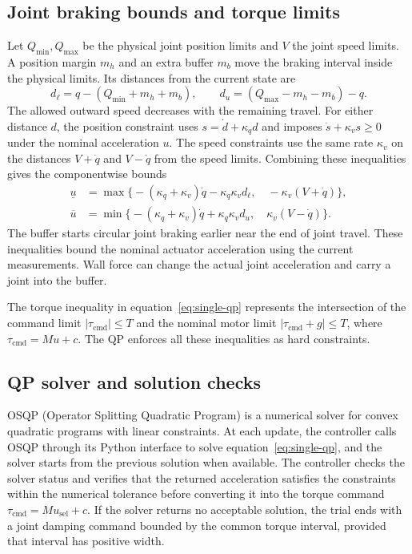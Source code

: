 \documentclass[11pt,a4paper]{article}
\begin{document}
\subsection{Joint braking bounds and torque limits}
Let $Q_{\min},Q_{\max}$ be the physical joint position limits and $V$ the
joint speed limits. A position margin $m_h$ and an extra buffer $m_b$
move the braking interval inside the physical limits. Its distances from
the current state are
\begin{equation}
 d_\ell=q-(Q_{\min}+m_h+m_b),\qquad
 d_u=(Q_{\max}-m_h-m_b)-q .
\end{equation}
The allowed outward speed decreases with the remaining travel.
For either distance $d$, the position constraint uses
$s=\dot d+\kappa_q d$ and imposes $\dot s+\kappa_v s\ge0$ under the
nominal acceleration $u$. The speed constraints use the same rate
$\kappa_v$ on the distances $V+\dot q$ and $V-\dot q$ from the speed
limits. Combining these inequalities gives the componentwise bounds
\begin{equation}
 \begin{aligned}
 \underline u&=\max\bigl\{
 -(\kappa_q+\kappa_v)\dot q-\kappa_q\kappa_v d_\ell,\quad
 -\kappa_v(V+\dot q)\bigr\},\\
 \overline u&=\min\bigl\{
 -(\kappa_q+\kappa_v)\dot q+\kappa_q\kappa_v d_u,\quad
 \kappa_v(V-\dot q)\bigr\}.
 \end{aligned}
 \label{eq:braking-bounds}
\end{equation}
The buffer starts circular joint braking earlier near the end of joint
travel. These inequalities bound the nominal actuator acceleration
using the current measurements. Wall force can change the actual
joint acceleration and carry a joint into the buffer.

The torque inequality in equation~\eqref{eq:single-qp} represents the
intersection of the command limit $|\tau_{\mathrm{cmd}}|\le T$
and the nominal motor limit $|\tau_{\mathrm{cmd}}+g|\le T$, where
$\tau_{\mathrm{cmd}}=Mu+c$. The QP enforces all these inequalities as hard
constraints.

\subsection{QP solver and solution checks}
OSQP (Operator Splitting Quadratic Program) is a numerical solver for
convex quadratic programs with linear constraints. At each update, the
controller calls OSQP through its Python interface to solve
equation~\eqref{eq:single-qp}, and the solver starts from the previous
solution when available.
The controller checks the solver status and verifies that the returned
acceleration satisfies the constraints within the numerical tolerance
before converting it into the torque command
$\tau_{\mathrm{cmd}}=Mu_{\mathrm{sel}}+c$.
If the solver returns no acceptable solution, the trial ends with a
joint damping command bounded by the common torque interval, provided
that interval has positive width.
\end{document}
